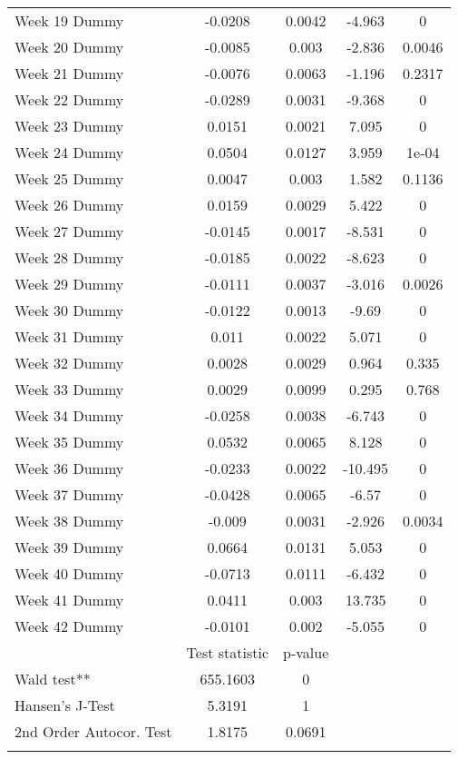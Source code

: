 \begin{longtable}{lcccc}
  Week 19 Dummy & -0.0208 & 0.0042 & -4.963 & 0 \\ 
  Week 20 Dummy & -0.0085 & 0.003 & -2.836 & 0.0046 \\ 
  Week 21 Dummy & -0.0076 & 0.0063 & -1.196 & 0.2317 \\ 
  Week 22 Dummy & -0.0289 & 0.0031 & -9.368 & 0 \\ 
  Week 23 Dummy & 0.0151 & 0.0021 & 7.095 & 0 \\ 
  Week 24 Dummy & 0.0504 & 0.0127 & 3.959 & 1e-04 \\ 
  Week 25 Dummy & 0.0047 & 0.003 & 1.582 & 0.1136 \\ 
  Week 26 Dummy & 0.0159 & 0.0029 & 5.422 & 0 \\ 
  Week 27 Dummy & -0.0145 & 0.0017 & -8.531 & 0 \\ 
  Week 28 Dummy & -0.0185 & 0.0022 & -8.623 & 0 \\ 
  Week 29 Dummy & -0.0111 & 0.0037 & -3.016 & 0.0026 \\ 
  Week 30 Dummy & -0.0122 & 0.0013 & -9.69 & 0 \\ 
  Week 31 Dummy & 0.011 & 0.0022 & 5.071 & 0 \\ 
  Week 32 Dummy & 0.0028 & 0.0029 & 0.964 & 0.335 \\ 
  Week 33 Dummy & 0.0029 & 0.0099 & 0.295 & 0.768 \\ 
  Week 34 Dummy & -0.0258 & 0.0038 & -6.743 & 0 \\ 
  Week 35 Dummy & 0.0532 & 0.0065 & 8.128 & 0 \\ 
  Week 36 Dummy & -0.0233 & 0.0022 & -10.495 & 0 \\ 
  Week 37 Dummy & -0.0428 & 0.0065 & -6.57 & 0 \\ 
  Week 38 Dummy & -0.009 & 0.0031 & -2.926 & 0.0034 \\ 
  Week 39 Dummy & 0.0664 & 0.0131 & 5.053 & 0 \\ 
  Week 40 Dummy & -0.0713 & 0.0111 & -6.432 & 0 \\ 
  Week 41 Dummy & 0.0411 & 0.003 & 13.735 & 0 \\ 
  Week 42 Dummy & -0.0101 & 0.002 & -5.055 & 0 \\ 
   & Test statistic & p-value &  &  \\ 
  Wald test** & 655.1603 & 0 &  &  \\ 
  Hansen's J-Test & 5.3191 & 1 &  &  \\ 
  2nd Order Autocor. Test & 1.8175 & 0.0691 &  &  \\ 
   \bottomrule
\caption{Results of two-step GMM estimation of policy, behavior and information on %
\label{tab_results:cases_spec_2_full}
\end{longtable}
\endgroup
